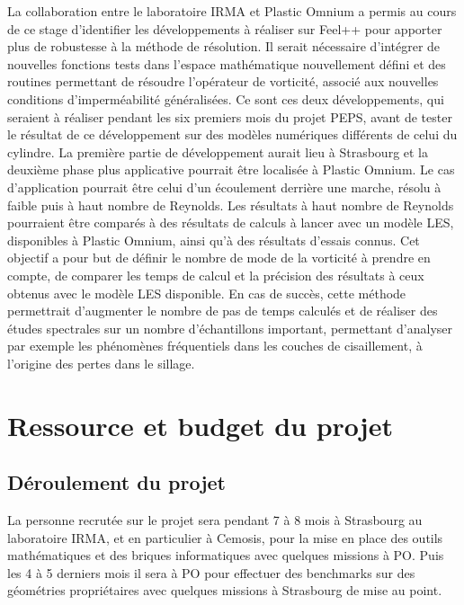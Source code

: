 \documentclass[12pt]{article}
\begin{document}
La collaboration entre le laboratoire IRMA et Plastic Omnium a permis au cours
de ce stage d’identifier les développements à réaliser sur Feel++ pour apporter
plus de robustesse à la méthode de résolution. Il serait nécessaire d’intégrer
de nouvelles fonctions tests dans l’espace mathématique nouvellement défini et
des routines permettant de résoudre l’opérateur de vorticité, associé aux
nouvelles conditions d’imperméabilité généralisées. Ce sont ces deux
développements, qui seraient à réaliser pendant les six premiers mois du projet
PEPS, avant de tester le résultat de ce développement sur des modèles numériques
différents de celui du cylindre. La première partie de développement aurait lieu
à Strasbourg et la deuxième phase plus applicative pourrait être localisée à
Plastic Omnium. Le cas d’application pourrait être celui d’un écoulement
derrière une marche, résolu à faible puis à haut nombre de Reynolds. Les
résultats à haut nombre de Reynolds pourraient être comparés à des résultats de
calculs à lancer avec un modèle LES, disponibles à Plastic Omnium, ainsi qu’à des
résultats d’essais connus. Cet objectif a pour but de définir le nombre de mode
de la vorticité à prendre en compte, de comparer les temps de calcul et la
précision des résultats à ceux obtenus avec le modèle LES disponible. En cas de
succès, cette méthode permettrait d’augmenter le nombre de pas de temps calculés
et de  réaliser des études spectrales sur un nombre d’échantillons important,
permettant d’analyser par exemple les phénomènes fréquentiels dans les couches
de cisaillement, à l’origine des pertes dans le sillage.



\section{Ressource et budget du projet}
\label{sec:budget}

\subsection{Déroulement du projet}
\label{sec:dero-du-proj}

La personne recrutée sur le projet sera pendant 7 à 8 mois à Strasbourg au
laboratoire IRMA, et en particulier à Cemosis, pour la mise en place des outils
mathématiques et des briques informatiques avec quelques missions à PO. Puis les
4 à 5 derniers mois il sera à PO pour effectuer des benchmarks sur des
géométries propriétaires avec quelques missions à Strasbourg de mise au point.
\end{document}
